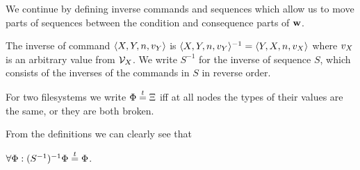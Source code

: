 \bigskip

\noindent
We continue by defining inverse commands and sequences
which allow us to move parts of sequences between the
condition and consequence parts of $\mathbf{w}$.

\begin{mydef}
The inverse of command $\langle{X,Y,n,v_Y}\rangle$ is $\langle{X,Y,n,v_Y}\rangle^{-1} = \langle{Y,X,n,v_X}\rangle$
where $v_X$ is an arbitrary value from $\mathcal{V}_{X}$.
We write $S^{-1}$ for the inverse of sequence $S$, which consists of the inverses of the commands in $S$
in reverse order.
\end{mydef}

\begin{mydef}[$\typeeq$]
For two filesystems we write $\Phi\stackrel{t}{=}\Xi$
iff 
at all nodes the types of their values are the same, or they are both broken.
\end{mydef}

From the definitions we can clearly see that
\begin{mycor}\label{negneg_is_typeeq}
$\forall \Phi: (S^{-1})^{-1}\Phi\stackrel{t}{=} \Phi$.
\end{mycor}

